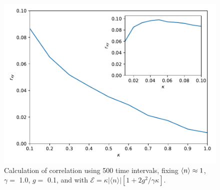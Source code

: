 \documentclass[conference]{IEEEtran}
\begin{document}
\begin{center}
\begin{figure}[t!]
\begin{center}
\includegraphics[scale = 0.45]{million1.pdf}
\caption{\small{Calculation of correlation using 500 time intervals, fixing $\expval{n} \approx 1$, $\gamma =$ 1.0, $g = $ 0.1, and with  $\mathcal{E} =  \kappa |\langle n \rangle|[1 + 2g^2/\gamma \kappa]$.}} \label{corrxy}
\end{center}  
\end{figure}
\end{center}
\end{document}
